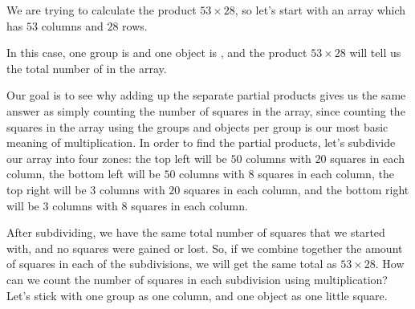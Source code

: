 \documentclass{ximera}
\begin{document}
\begin{explanation}
We are trying to calculate the product $53 \times 28$, so let's start with an array which has $53$ columns and $28$ rows.

\begin{image}
\end{image}
In this case, one group is  and one object is  , and the product $53 \times 28$ will tell us the total number of  in the array.

Our goal is to see why adding up the separate partial products gives us the same answer as simply counting the number of squares in the array, since counting the squares in the array using the groups and objects per group is our most basic meaning of multiplication. In order to find the partial products, let's subdivide our array into four zones: the top left will be $50$ columns with $20$ squares in each column, the bottom left will be $50$ columns with $8$ squares in each column, the top right will be $3$ columns with $20$ squares in each column, and the bottom right will be $3$ columns with $8$ squares in each column.

\begin{image}
\end{image}

After subdividing, we have the same total number of squares that we started with, and no squares were gained or lost. So, if we combine together the amount of squares in each of the subdivisions, we will get the same total as $53 \times 28$. How can we count the number of squares in each subdivision using multiplication? Let's stick with one group as one column, and one object as one little square.


\end{explanation}
\end{document}
